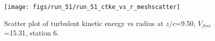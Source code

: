\begin{figure}[H]
\centering
\texttt{[image: figs/run\_51/run\_51\_ctke\_vs\_r\_meshscatter]}
\caption{Scatter plot of turbulent kinetic energy vs radius at $z/c$=9.50, $V_{free}$=15.31, station 6.}
\end{figure}


